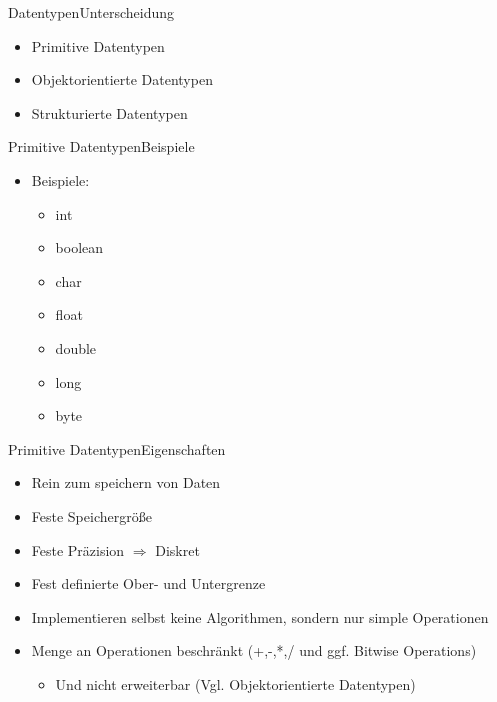 \begin{frame}{Datentypen}{Unterscheidung}
	\begin{itemize}
		\item Primitive Datentypen
		\item Objektorientierte Datentypen
		\item Strukturierte Datentypen
	\end{itemize}
\end{frame}

\begin{frame}{Primitive Datentypen}{Beispiele}
	\begin{itemize}
	\item Beispiele:
		\begin{itemize}
			\item int
			\item boolean
			\item char
			\item float
			\item double
			\item long
			\item byte
		\end{itemize}
	\end{itemize}
\end{frame}

\begin{frame}{Primitive Datentypen}{Eigenschaften}
	\begin{itemize}
		\item Rein zum speichern von Daten
		\item Feste Speichergröße
		\item Feste Präzision $\Rightarrow$ Diskret
		\item Fest definierte Ober- und Untergrenze
		\item Implementieren selbst keine Algorithmen, sondern nur simple Operationen
		\item Menge an Operationen beschränkt (+,-,*,/ und ggf. Bitwise Operations)
		\begin{itemize}
			\item Und nicht erweiterbar (Vgl. Objektorientierte Datentypen)
		\end{itemize}
	\end{itemize}
\end{frame}

